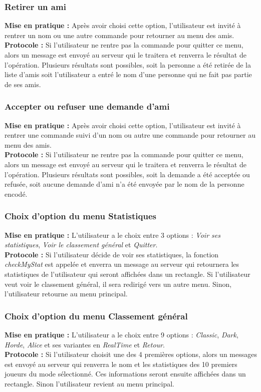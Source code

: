 \documentclass[10pt, a4paper]{article}
\begin{document}
\subsubsection{Retirer un ami}
\textbf{Mise en pratique :} Après avoir choisi cette option, l'utilisateur est invité à rentrer un nom ou une autre commande pour retourner au menu des amis.\\
\textbf{Protocole :} Si l'utilisateur ne rentre pas la commande pour quitter ce menu, alors un message est envoyé au serveur qui le traitera et renverra le résultat de l'opération. Plusieurs résultats sont possibles, soit la personne a été retirée de la liste d'amis soit l'utilisateur a entré le nom d'une personne qui ne fait pas partie de ses amis.\\

\subsubsection{Accepter ou refuser une demande d'ami}
\textbf{Mise en pratique :} Après avoir choisi cette option, l'utilisateur est invité à rentrer une commande suivi d'un nom ou autre une commande pour retourner au menu des amis.\\
\textbf{Protocole :} Si l'utilisateur ne rentre pas la commande pour quitter ce menu, alors un message est envoyé au serveur qui le traitera et renverra le résultat de l'opération. Plusieurs résultats sont possibles, soit la demande a été acceptée ou refusée, soit aucune demande d'ami n'a été envoyée par le nom de la personne encodé.\\


\subsubsection{Choix d'option du menu Statistiques}
\textbf{Mise en pratique :} L'utilisateur a le choix entre 3 options : \textit{Voir ses statistiques}, \textit{Voir le classement général} et \textit{Quitter}.\\
\textbf{Protocole :} Si l'utilisateur décide de voir ses statistiques, la fonction \textit{checkMyStat} est appelée et enverra un message au serveur qui retournera les statistiques de l'utilisateur qui seront affichées dans un rectangle. Si l'utilisateur veut voir le classement général, il sera redirigé vers un autre menu. Sinon, l'utilisateur retourne au menu principal.\\

\subsubsection{Choix d'option du menu Classement général}
\textbf{Mise en pratique :} L'utilisateur a le choix entre 9 options : \textit{Classic}, \textit{Dark}, \textit{Horde}, \textit{Alice} et ses variantes en \textit{RealTime} et \textit{Retour}. \\
\textbf{Protocole :} Si l'utilisateur choisit une des 4 premières options, alors un messages est envoyé au serveur qui renverra le nom et les statistiques des 10 premiers joueurs du mode sélectionné. Ces informations seront ensuite affichées dans un rectangle. Sinon l'utilisateur revient au menu principal.\\
\end{document}
